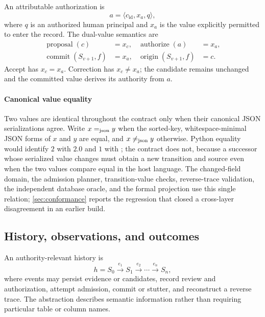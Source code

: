 An attributable authorization is
\begin{equation}
a=\langle c_{\mathrm{id}},x_a,q\rangle,
\label{eq:authorization}
\end{equation}
where $q$ is an authorized human principal and $x_a$ is the value explicitly permitted to enter the record. The dual-value semantics are
\begin{align}
\operatorname{proposal}(c)&=x_c, &
\operatorname{authorize}(a)&=x_a,\nonumber\\
\operatorname{commit}(S_{v+1},f)&=x_a, &
\operatorname{origin}(S_{v+1},f)&=c.
\label{eq:dual-value}
\end{align}
Accept has $x_c=x_a$. Correction has $x_c\neq x_a$; the candidate remains unchanged and the committed value derives its authority from $a$.

\paragraph{Canonical value equality}
Two values are identical throughout the contract only when their canonical JSON serializations agree. Write $x\mathrel{=_{\mathrm{json}}} y$ when the sorted-key, whitespace-minimal JSON forms of $x$ and $y$ are equal, and $x\mathrel{\neq_{\mathrm{json}}} y$ otherwise. Python equality would identify $2$ with $2.0$ and $1$ with ; the contract does not, because a successor whose serialized value changes must obtain a new transition and source even when the two values compare equal in the host language. The changed-field domain, the admission planner, transition-value checks, reverse-trace validation, the independent database oracle, and the formal projection use this single relation; \cref{sec:conformance} reports the regression that closed a cross-layer disagreement in an earlier build.

\subsection{History, observations, and outcomes}

An authority-relevant history is
\begin{equation}
h=S_0\xrightarrow{e_1}S_1\xrightarrow{e_2}\cdots\xrightarrow{e_n}S_n,
\end{equation}
where events may persist evidence or candidates, record review and authorization, attempt admission, commit or stutter, and reconstruct a reverse trace. The abstraction describes semantic information rather than requiring particular table or column names.

